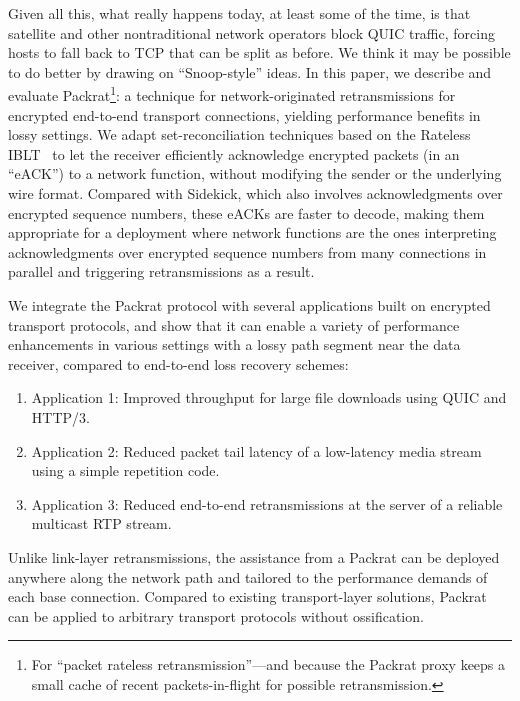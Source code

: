 Given all this, what really happens today, at least some
of the time, is that satellite and other nontraditional network
operators block QUIC traffic, forcing hosts to fall back to TCP that
can be split as before. We think it may be possible to do better by drawing on ``Snoop-style''
ideas. In this paper, we describe and evaluate Packrat\footnote{For
``packet rateless retransmission''---and because the Packrat proxy keeps
a small cache of recent packets-in-flight for possible
retransmission.}: a technique for network-originated retransmissions
for encrypted end-to-end transport connections, yielding performance
benefits in lossy settings. We adapt set-reconciliation techniques
based on the Rateless IBLT~\cite{yang2024practical} to let the
receiver efficiently acknowledge encrypted packets (in an ``eACK'') to a network
function, without modifying the sender or the underlying wire
format. Compared with Sidekick, which also involves
acknowledgments over encrypted sequence numbers, these eACKs
are faster to decode, making them appropriate for a deployment
where network functions are the ones interpreting acknowledgments over
encrypted sequence numbers from many connections in parallel and
triggering retransmissions as a result.


We integrate the Packrat protocol with several applications built on encrypted
transport protocols, and show that it can enable a variety of performance
enhancements in various settings with a lossy path segment near the data receiver,
compared to end-to-end loss recovery schemes:

\begin{enumerate}[noitemsep]
\item Application 1: Improved throughput for large file downloads using QUIC and HTTP/3.
\item Application 2: Reduced packet tail latency of a low-latency media stream using a simple repetition code.
\item Application 3: Reduced end-to-end retransmissions at the server of a reliable multicast RTP stream.
\end{enumerate}

\noindent Unlike link-layer retransmissions, the assistance from a Packrat can be
deployed anywhere along the network path and tailored to the performance
demands of each base connection. Compared to existing transport-layer
solutions, Packrat can be applied to arbitrary transport protocols without
ossification.

